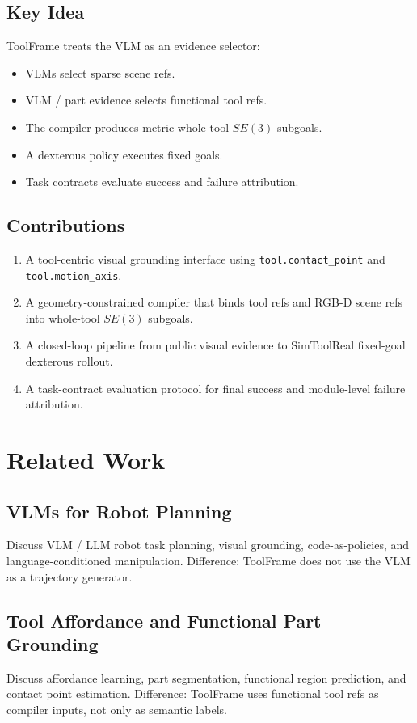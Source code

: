 \documentclass[journal]{IEEEtran}
\newcommand{\method}{ToolFrame}
\begin{document}
\subsection{Key Idea}
\method{} treats the VLM as an evidence selector:
\begin{itemize}
  \item VLMs select sparse scene refs.
  \item VLM / part evidence selects functional tool refs.
  \item The compiler produces metric whole-tool $SE(3)$ subgoals.
  \item A dexterous policy executes fixed goals.
  \item Task contracts evaluate success and failure attribution.
\end{itemize}

\subsection{Contributions}
\begin{enumerate}
  \item A tool-centric visual grounding interface using
  \texttt{tool.contact\_point} and \texttt{tool.motion\_axis}.
  \item A geometry-constrained compiler that binds tool refs and RGB-D scene
  refs into whole-tool $SE(3)$ subgoals.
  \item A closed-loop pipeline from public visual evidence to SimToolReal
  fixed-goal dexterous rollout.
  \item A task-contract evaluation protocol for final success and module-level
  failure attribution.
\end{enumerate}

\section{Related Work}
\subsection{VLMs for Robot Planning}
Discuss VLM / LLM robot task planning, visual grounding, code-as-policies, and
language-conditioned manipulation. Difference: \method{} does not use the VLM
as a trajectory generator.

\subsection{Tool Affordance and Functional Part Grounding}
Discuss affordance learning, part segmentation, functional region prediction,
and contact point estimation. Difference: \method{} uses functional tool refs
as compiler inputs, not only as semantic labels.
\end{document}
